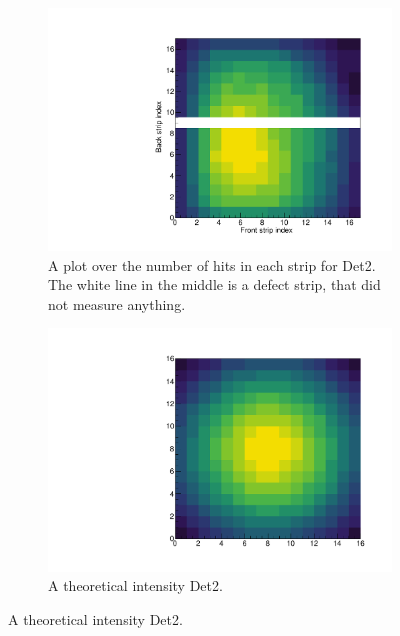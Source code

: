 \begin{figure}[h]
	\begin{subfigure}[t]{.5\linewidth}
		\centering
		\includegraphics[width=\linewidth]{../figures/mexihatDet2.pdf}
		\caption{A plot over the number of hits in each strip for Det2. The white line in the middle is a defect strip, that did not measure anything. }
		\label{fig:MexiHatDetector}
	\end{subfigure}
	\begin{subfigure}[t]{.5\linewidth}
		\centering
		\includegraphics[width=\linewidth]{../figures/mexihatDet2THEORY.pdf}
		\caption{A theoretical intensity Det2. }
		\label{fig:MexiHatDetectorTheory}
	\end{subfigure}
\end{figure}

